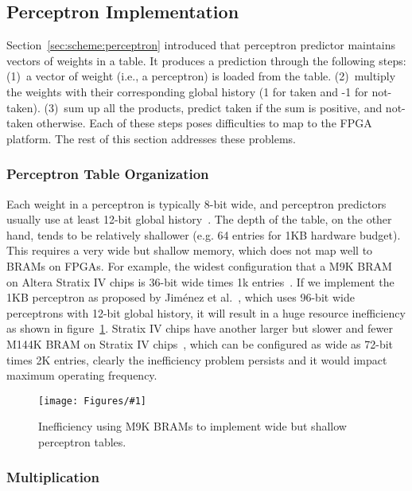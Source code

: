 \documentclass[conference]{IEEEtran}
\newcommand{\kfig}[4]{ %
        \begin{figure}[!t]
        \centering
        \texttt{[image: Figures/\#1]}
        \vspace{-1mm}
        \caption{#3}
        \label{#2}
        \end{figure}
}
\begin{document}
\subsection{Perceptron Implementation}
\label{sec:fpga:perceptron}

Section~\ref{sec:scheme:perceptron} introduced that perceptron predictor maintains vectors of weights in a table. It produces a prediction through the following steps: (1)~a vector of weight (i.e., a perceptron) is loaded from the table. (2)~multiply the weights with their corresponding global history (1 for taken and -1 for not-taken). (3)~sum up all the products, predict taken if the sum is positive, and not-taken otherwise. Each of these steps poses difficulties to map to the FPGA platform. The rest of this section addresses these problems.

\subsubsection{Perceptron Table Organization}
\label{sec:fpga:perceptron:table}
Each weight in a perceptron is typically 8-bit wide, and perceptron predictors usually use at least 12-bit global history~\cite{perceptron}. The depth of the table, on the other hand, tends to be relatively shallower (e.g. 64 entries for 1KB hardware budget). This requires a very wide but shallow memory, which does not map well to BRAMs on FPGAs. For example, the widest configuration that a M9K BRAM on Altera Stratix IV chips is 36-bit wide times 1k entries~\cite{StratixIVM9K}. If we implement the 1KB perceptron as proposed by Jim\'enez et al.~\cite{perceptron}, which uses 96-bit wide perceptrons with 12-bit global history, it will result in a huge resource inefficiency as shown in figure~\ref{fig:perceptronTable}. Stratix IV chips have another larger but slower and fewer M144K BRAM on Stratix IV chips~\cite{StratixIVM9K}, which can be configured as wide as 72-bit times 2K entries, clearly the inefficiency problem persists and it would impact maximum operating frequency.
\kfig{perceptronTable.pdf}{fig:perceptronTable}{Inefficiency using M9K BRAMs to implement wide but shallow perceptron tables.}{angle = 0, trim = 1in 2in 3.4in 0.5in, clip, width=0.3\textwidth}





\subsubsection{Multiplication}
\label{sec:fpga:perceptron:mult}
\end{document}
